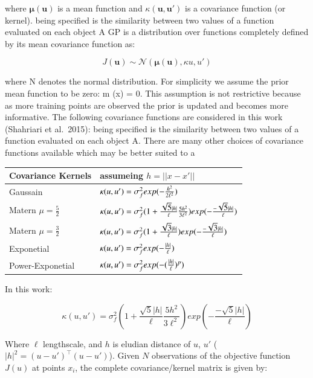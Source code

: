 \documentclass[]{elsarticle} %
\begin{document}
where \(\mathbf{\mu(u)}\) is a mean function and \(\kappa(\mathbf{u},\mathbf{u'})\) is a covariance function (or kernel). being specified is the similarity between two values of a function evaluated on each object A GP is a distribution over functions completely defined by its mean covariance function as:

\begin{equation}
J(\mathbf{u}) \sim \mathcal{N}(\mathbf{\mu(u)}, \kappa{u,u'})
\label{eq:mean_cov_gp}
\end{equation}

where N denotes the normal distribution. For simplicity we assume the prior mean function to be zero: m (x) = 0. This assumption is not restrictive because as more training points are observed the prior is updated and becomes more informative. The following covariance functions are considered in this work (Shahriari et al.~2015): being specified is the similarity between two values of a function evaluated on each object A. There are many other choices of covariance functions available which may be better suited to a

\begin{tabu} to 
\toprule
Covariance Kernels & assumeing $h=||x-x'||$\\
\midrule
Gaussain & $\Large \kappa (u,u') =\sigma_f^2 exp(-\frac{h^2}{2\ell^2})$\\
Matern $\mu=\frac{5}{2}$ & $\Large \kappa (u,u') =\sigma_f^2(1 + \frac{\sqrt{5}|h|}{\ell}\frac{5h^2}{3\ell^2})exp(-\frac{ -\sqrt{5}|h|}{\ell})$\\
Matern $\mu=\frac{3}{2}$ & $\Large \kappa (u,u') =\sigma_f^2(1 + \frac{\sqrt{3}|h|}{\ell})exp(-\frac{-\sqrt{3}|h|}{\ell})$\\
Exponetial & $\Large \kappa (u,u') =\sigma_f^2 exp(-\frac{|h|}{\ell})$\\
Power-Exponetial & $\Large \kappa (u,u') =\sigma_f^2 exp(-(\frac{|h|}{\ell})^p)$\\
\bottomrule
\end{tabu}

In this work:

\begin{equation}
\kappa (u,u') =\sigma_f^2(1 + \frac{\sqrt{5}|h|}{\ell}\frac{5h^2}{3\ell^2})exp(-\frac{-\sqrt{5}|h|}{\ell})
\label{eq:kernels}
\end{equation}

Where \(\ell\) lengthscale, and \(h\) is eludian distance of \(u\), \(u'\) (\(|h|^2=(u-u')^\intercal(u-u')\)). Given \(N\) observations of the objective function \(J(u)\) at points \(x_i\), the complete covariance/kernel matrix is given by:
\end{document}
